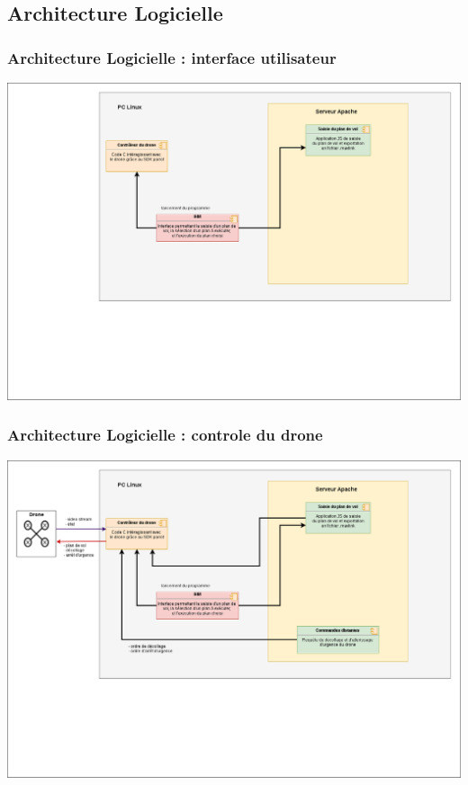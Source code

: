 \documentclass{beamer}
\begin{document}
	\begin{frame}
	\section{Architecture Logicielle}
		\begin{center}
		\frametitle{Architecture Logicielle : interface utilisateur}

       
        \includegraphics[scale=0.24]{01_archi_logicielle_IHM.png}
		\end{center}
	\end{frame}
	


	\begin{frame}
		
		\begin{center}
		\frametitle{Architecture Logicielle : controle du drone}

       
        \includegraphics[scale=0.24]{02_archi_logicielle_controle_drone.png}
		\end{center}
	\end{frame}
	
\end{document}
